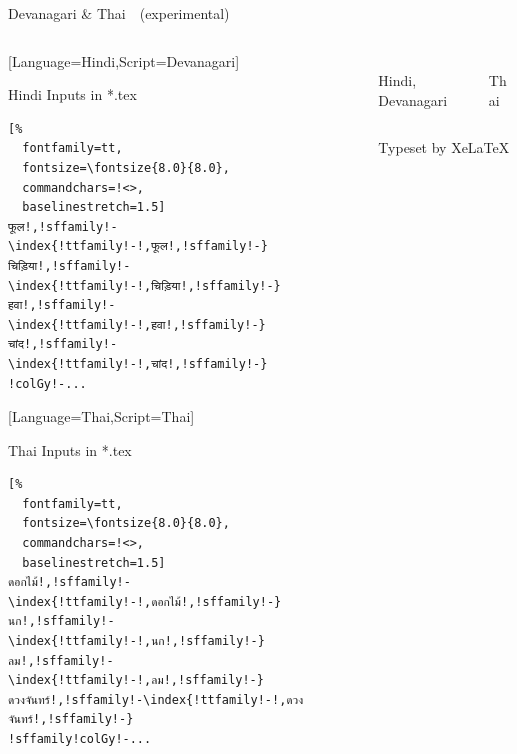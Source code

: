 \documentclass[aspectratio=169,10pt]{beamer}
\begin{document}

\setmonofont{Noto Sans Mono}
\begin{frame}[fragile]{Devanagari \& Thai~~{\scriptsize (experimental)}}

\begin{columns}
\begin{column}{50mm}

\setmonofont{Noto Serif Devanagari}[Language=Hindi,Script=Devanagari]
\setmainfont{Noto Sans Mono}
\setsansfont{Noto Sans}
\begin{exampleblock}{Hindi Inputs in *.tex}
\begin{Verbatim}[%
  fontfamily=tt,
  fontsize=\fontsize{8.0}{8.0},
  commandchars=!<>,
  baselinestretch=1.5]
फूल!,!sffamily!-\index{!ttfamily!-!,फूल!,!sffamily!-}
चिड़िया!,!sffamily!-\index{!ttfamily!-!,चिड़िया!,!sffamily!-}
हवा!,!sffamily!-\index{!ttfamily!-!,हवा!,!sffamily!-}
चांद!,!sffamily!-\index{!ttfamily!-!,चांद!,!sffamily!-}
!colGy!-...
\end{Verbatim}
\end{exampleblock}
\setmonofont{Noto Serif Thai}[Language=Thai,Script=Thai]
\setmainfont{Noto Sans Mono}
\setsansfont{Noto Sans}
\begin{exampleblock}{Thai Inputs in *.tex}
\begin{Verbatim}[%
  fontfamily=tt,
  fontsize=\fontsize{8.0}{8.0},
  commandchars=!<>,
  baselinestretch=1.5]
ดอกไม้!,!sffamily!-\index{!ttfamily!-!,ดอกไม้!,!sffamily!-}
นก!,!sffamily!-\index{!ttfamily!-!,นก!,!sffamily!-}
ลม!,!sffamily!-\index{!ttfamily!-!,ลม!,!sffamily!-}
ดวงจันทร์!,!sffamily!-\index{!ttfamily!-!,ดวงจันทร์!,!sffamily!-}
!sffamily!colGy!-...
\end{Verbatim}
\end{exampleblock}
\end{column}

\begin{column}{79mm}

\begin{columns}
\begin{column}{39mm}
\begin{center}
\\[2mm]%
Hindi, Devanagari
\end{center}
\end{column}

\begin{column}{39mm}
\begin{center}
\\[2mm]%
Thai
\end{center}
\end{column}
\end{columns}
\vspace{2mm}
\begin{center}
{\normalsize Typeset by XeLaTeX}
\end{center}
\end{column}


\end{columns}
\end{frame}
\end{document}
